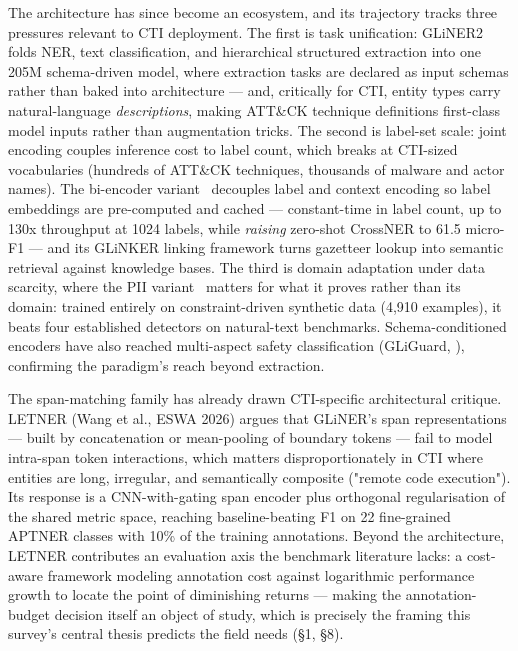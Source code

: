 \documentclass[11pt]{article}
\begin{document}
The architecture has since become an ecosystem, and its trajectory tracks three pressures relevant to CTI deployment. The first is task unification: GLiNER2~\citep{zaratiana2025gliner2} folds NER, text classification, and hierarchical structured extraction into one 205M schema-driven model, where extraction tasks are declared as input schemas rather than baked into architecture — and, critically for CTI, entity types carry natural-language \emph{descriptions}, making ATT\&CK technique definitions first-class model inputs rather than augmentation tricks. The second is label-set scale: joint encoding couples inference cost to label count, which breaks at CTI-sized vocabularies (hundreds of ATT\&CK techniques, thousands of malware and actor names). The bi-encoder variant~\citep{stepanov2026millionlabel} decouples label and context encoding so label embeddings are pre-computed and cached — constant-time in label count, up to 130x throughput at 1024 labels, while \emph{raising} zero-shot CrossNER to 61.5 micro-F1 — and its GLiNKER linking framework turns gazetteer lookup into semantic retrieval against knowledge bases. The third is domain adaptation under data scarcity, where the PII variant~\citep{zaratiana2026gliner2pii} matters for what it proves rather than its domain: trained entirely on constraint-driven synthetic data (4,910 examples), it beats four established detectors on natural-text benchmarks. Schema-conditioned encoders have also reached multi-aspect safety classification (GLiGuard, \citealp{zaratiana2026gliguard}), confirming the paradigm's reach beyond extraction.

The span-matching family has already drawn CTI-specific architectural critique. LETNER (Wang et al., ESWA 2026) argues that GLiNER's span representations — built by concatenation or mean-pooling of boundary tokens — fail to model intra-span token interactions, which matters disproportionately in CTI where entities are long, irregular, and semantically composite ("remote code execution"). Its response is a CNN-with-gating span encoder plus orthogonal regularisation of the shared metric space, reaching baseline-beating F1 on 22 fine-grained APTNER classes with 10\% of the training annotations. Beyond the architecture, LETNER contributes an evaluation axis the benchmark literature lacks: a cost-aware framework modeling annotation cost against logarithmic performance growth to locate the point of diminishing returns — making the annotation-budget decision itself an object of study, which is precisely the framing this survey's central thesis predicts the field needs (§1, §8).
\end{document}
